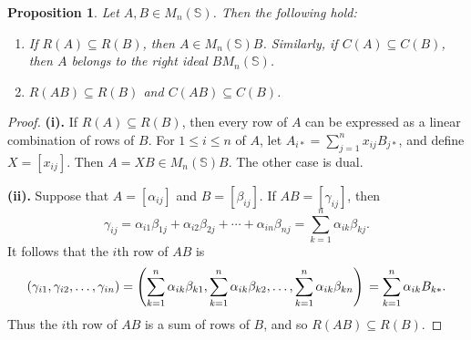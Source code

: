 \documentclass[11pt]{article}
\newtheorem{prop}[thm]{Proposition}
\numberwithin{equation}{section}
\begin{document}
\begin{prop}
  Let $A, B \in M_n(\mathbb{S})$. Then the following hold:
  \begin{enumerate}[label={\rm (\roman*)}]
    \item
      If $R(A) \subseteq R(B)$, then $A \in M_n(\mathbb{S}) B$.  Similarly, if $C(A)
      \subseteq C(B)$, then $A$ belongs to the right ideal $BM_n(\mathbb{S})$.

    \item 
      $R(AB) \subseteq R(B)$ and $C(AB) \subseteq C(B)$.
  \end{enumerate}
\end{prop}
\begin{proof}
  \noindent \textbf{(i).}
  If $R(A) \subseteq R(B)$, then every row of $A$ can be expressed as a linear
  combination of rows of $B$. For $1 \leq i \leq n$ of $A$, let $A_{i*} =
  \sum_{j = 1}^{n}x_{ij}B_{j*}$, and define $X = [x_{ij}]$. Then $A = XB \in
  M_n(\mathbb{S})B$. The other case is dual.
  \bigskip

  \noindent \textbf{(ii).}
  Suppose that $A = [\alpha_{ij}]$ and $B = [\beta_{ij}]$. If 
  $AB = [\gamma_{ij}]$, then 
  \[
  \gamma_{ij} = \alpha_{i1} \beta_{1j} + \alpha_{i2}\beta_{2j} 
                + \cdots + \alpha_{in}\beta_{nj}
              = \sum_{k = 1} ^ {n} \alpha_{ik}\beta_{kj}.
  \]
  It follows that the $i$th row of $AB$ is 
  \[
  (\gamma_{i1}, \gamma_{i2}, \ldots, \gamma_{in})
   =  \left (\sum_{k = 1} ^ {n} \alpha_{ik}\beta_{k1},
     \sum_{k = 1} ^ {n} \alpha_{ik}\beta_{k2},
     \ldots, 
     \sum_{k = 1} ^ {n} \alpha_{ik}\beta_{kn}\right) \\
    =
    \sum_{k = 1} ^ {n} 
    \alpha_{ik}B_{k*}.
  \]
  Thus the $i$th row of $AB$ is a sum of rows of $B$, and so $R(AB) \subseteq
  R(B)$. 
\end{proof}
\end{document}
